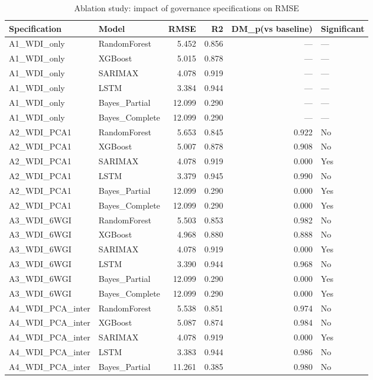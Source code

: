 \begin{table}
\caption{Ablation study: impact of governance specifications on RMSE}
\label{tab:ablation}
\begin{tabular}{llrrrl}
\toprule
Specification & Model & RMSE & R2 & DM\_p(vs baseline) & Significant \\
\midrule
A1\_WDI\_only & RandomForest & 5.452 & 0.856 & — & — \\
A1\_WDI\_only & XGBoost & 5.015 & 0.878 & — & — \\
A1\_WDI\_only & SARIMAX & 4.078 & 0.919 & — & — \\
A1\_WDI\_only & LSTM & 3.384 & 0.944 & — & — \\
A1\_WDI\_only & Bayes\_Partial & 12.099 & 0.290 & — & — \\
A1\_WDI\_only & Bayes\_Complete & 12.099 & 0.290 & — & — \\
A2\_WDI\_PCA1 & RandomForest & 5.653 & 0.845 & 0.922 & No \\
A2\_WDI\_PCA1 & XGBoost & 5.007 & 0.878 & 0.908 & No \\
A2\_WDI\_PCA1 & SARIMAX & 4.078 & 0.919 & 0.000 & Yes \\
A2\_WDI\_PCA1 & LSTM & 3.379 & 0.945 & 0.990 & No \\
A2\_WDI\_PCA1 & Bayes\_Partial & 12.099 & 0.290 & 0.000 & Yes \\
A2\_WDI\_PCA1 & Bayes\_Complete & 12.099 & 0.290 & 0.000 & Yes \\
A3\_WDI\_6WGI & RandomForest & 5.503 & 0.853 & 0.982 & No \\
A3\_WDI\_6WGI & XGBoost & 4.968 & 0.880 & 0.888 & No \\
A3\_WDI\_6WGI & SARIMAX & 4.078 & 0.919 & 0.000 & Yes \\
A3\_WDI\_6WGI & LSTM & 3.390 & 0.944 & 0.968 & No \\
A3\_WDI\_6WGI & Bayes\_Partial & 12.099 & 0.290 & 0.000 & Yes \\
A3\_WDI\_6WGI & Bayes\_Complete & 12.099 & 0.290 & 0.000 & Yes \\
A4\_WDI\_PCA\_inter & RandomForest & 5.538 & 0.851 & 0.974 & No \\
A4\_WDI\_PCA\_inter & XGBoost & 5.087 & 0.874 & 0.984 & No \\
A4\_WDI\_PCA\_inter & SARIMAX & 4.078 & 0.919 & 0.000 & Yes \\
A4\_WDI\_PCA\_inter & LSTM & 3.383 & 0.944 & 0.986 & No \\
A4\_WDI\_PCA\_inter & Bayes\_Partial & 11.261 & 0.385 & 0.980 & No \\

\end{tabular}
\end{table}
